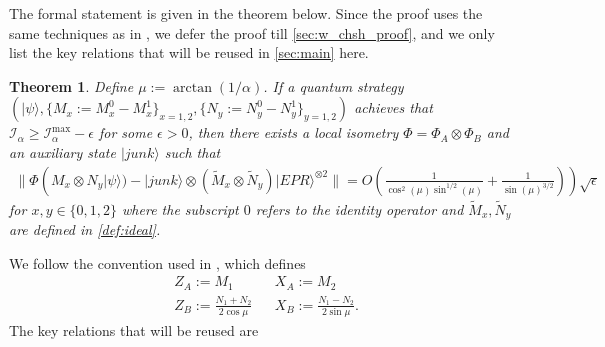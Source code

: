 \documentclass[11pt,letterpaper]{article}
\newcommand{\ket}[1]{|#1\rangle}
\newcommand{\x}{\otimes}
\newcommand{\1}{\mathbb{1}}
\newcommand{\tM}{\tilde{M}}
\newcommand{\tN}{\tilde{N}}
\newcommand{\I}{\mathcal{I}}
\newtheorem{theorem}{Theorem}[section]
\theoremstyle{definition}
\begin{document}
The formal statement is given in the theorem below. Since the proof uses the same techniques as in \cite{bamps2015},
we defer the proof till \cref{sec:w_chsh_proof}, and we only list the key relations that will be reused in \cref{sec:main} here.
\begin{theorem}
\label{thm:selftest}
    Define $\mu := \arctan(1/\alpha)$.
	If a quantum strategy $(\ket{\psi}, \{M_x:=M_x^0-M_x^1\}_{x=1,2}, \{N_y :=N_y^0-N_y^1\}_{y = 1,2} )$ achieves that
	$\I_\alpha \geq \I_\alpha^{\max} - \epsilon$
	for some $\epsilon > 0$, then
	there exists a local isometry $\Phi = \Phi_A \x \Phi_B$ and an auxiliary state $\ket{junk}$  such that
	\begin{align*}
		\| \Phi( M_x \x N_y \ket{\psi}) -\ket{junk} \x (\tM_x \x \tN_y) \ket{EPR}^{\x 2}  \| = O(\frac{1}{\cos^2(\mu)\sin^{1/2}(\mu)}+
		\frac{1}{\sin(\mu)^{3/2}})) \sqrt{\epsilon}
	\end{align*}
	for $x,y \in \{0, 1, 2\}$ where the subscript $0$ refers to the identity operator and $\tM_x, \tN_y$ are 
	defined in \cref{def:ideal}.  
\end{theorem}
We follow the convention used in \cite{bamps2015},
which defines
\begin{align*}
	&Z_A := M_1 && X_A := M_2\\
	&Z_B := \frac{N_1+N_2}{2\cos{\mu}} && X_B := \frac{N_1-N_2}{2\sin{\mu}}.
\end{align*}
The key relations that will be reused are
\end{document}
